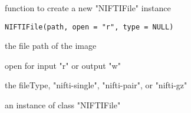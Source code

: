 \begin{Description}\relax
function to create a new "NIFTIFile" instance
\end{Description}
\begin{Usage}
\begin{verbatim}
NIFTIFile(path, open = "r", type = NULL)
\end{verbatim}
\end{Usage}
\begin{Arguments}
\begin{ldescription}
\item[\code{path}] the file path of the image 
\item[\code{open}] open for input "r" or output "w" 
\item[\code{type}] the fileType, "nifti-single", "nifti-pair", or "nifti-gz"
\end{ldescription}
\end{Arguments}
\begin{Value}
an instance of class "NIFTIFile"
\end{Value}

